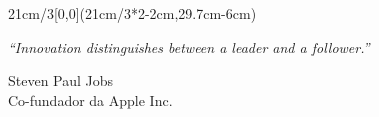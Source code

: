 \begin{textblock*}{21cm/3}[0,0](21cm/3*2-2cm,29.7cm-6cm)
  \begin{flushright}
\epigraph{\emph{``Innovation distinguishes between a leader and a follower.''}}{Steven Paul Jobs\\Co-fundador da Apple Inc.}
\end{flushright}
\end{textblock*}

\null\newpage
